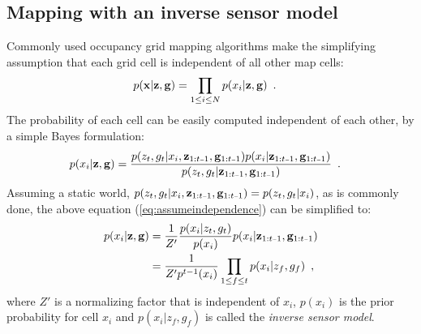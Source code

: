 \documentclass[letterpaper, 10 pt, conference]{ieeeconf} %
\begin{document}
\subsection{Mapping with an inverse sensor model}
Commonly used occupancy grid mapping algorithms
\cite{elfes1989using,moravec1988sensor,newcombe2011kinectfusion} make the
simplifying assumption that each grid cell is independent of all other map
cells: 
\newcommand{\remaining}{\measurements_{\prevtime}, \poses_{\prevtime}}
\begin{align}
  p(\mathbf{x}|\mathbf{z}, \mathbf{g}) &= \prod_{1 \le i \le N} p(x_i|\mathbf{z}, \mathbf{g})
  \enspace.
\end{align}
The probability of each cell can be easily computed independent of each other,
by a simple Bayes formulation:
\begin{align}
  p(x_i|\measurements, \poses) &= \frac{p(\meas_t, \pose_t|x_i, \remaining)p(x_i|\remaining)}
                         {p(\meas_t, \pose_t|\remaining)}\enspace.
  \label{eq:assumeindependence}
\end{align}
Assuming a static world, $p(z_t, g_t|x_i, \remaining) = p(z_t, g_t|x_i)$, as is 
commonly done, the
above equation (\ref{eq:assumeindependence}) can be simplified \cite{merali2013icra} to:
\begin{align}
 p(x_i|\measurements, \poses) 
 &= \frac{1}{Z'}\frac{p(x_i|\meas_t, \pose_t)}{p(x_i)}p(x_i|\remaining)\\
 &= \frac{1}{Z'p^{t-1}(x_i)}\prod_{1\le f \le t} p(x_i|\meas_f, \pose_f)\enspace,
\end{align}
where $Z'$ is a normalizing factor that is independent of $x_i$, $p(x_i)$ is
the prior probability for cell $x_i$ and $p(x_i|z_f, g_f)$ is called the
\textit{inverse sensor model}.
\end{document}
